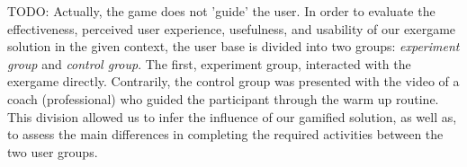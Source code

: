 TODO: Actually, the game does not 'guide' the user.
In order to evaluate the effectiveness, perceived user experience, usefulness, and usability of our exergame solution in the given context, the user base is divided into two groups: \textit{experiment group} and \textit{control group}. The first, experiment group, interacted with the exergame directly. Contrarily, the control group was presented with the video of a coach (professional) who guided the participant through the warm up routine. This division allowed us to infer the influence of our gamified solution, as well as, to assess the main differences in completing the required activities between the two user groups. 
